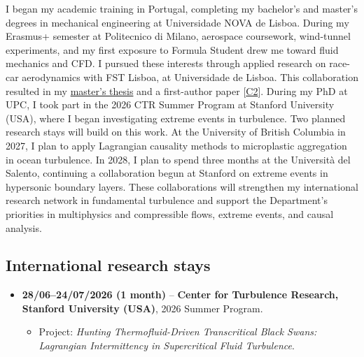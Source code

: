 \documentclass[11pt]{article}
\newcommand{\NEW}[1]{\iffinal #1\else{\color{red}#1}\fi} %
\begin{document}
I began my academic training in Portugal, completing my bachelor's and master's degrees in mechanical engineering at Universidade NOVA de Lisboa. During my Erasmus+ semester at Politecnico di Milano, aerospace coursework, \NEW{wind-tunnel} experiments, and my first exposure to Formula Student drew me toward fluid mechanics and CFD. I pursued these interests through applied research on race-car aerodynamics with FST Lisboa, at Universidade de Lisboa. This collaboration resulted in my \href{http://hdl.handle.net/10362/149236}{master's thesis}
and a first-author paper [\hyperlink{pub-C2}{C2}].
During my PhD at UPC, I took part in the 2026 CTR Summer Program at Stanford University (USA), where I began investigating extreme events in turbulence. Two planned research stays will build on this work. At the University of British Columbia in 2027, I plan to apply Lagrangian causality methods to microplastic aggregation in ocean turbulence. In 2028, I plan to spend three months at the Universit\`a del Salento, continuing a collaboration begun at Stanford on extreme events in hypersonic boundary layers. These collaborations will strengthen my international research network in fundamental turbulence and support the Department's priorities in multiphysics and compressible flows, extreme events, and causal analysis.

\subsection{International research stays}\label{sec:stays}
\begin{itemize}
  \item \textbf{28/06--24/07/2026 (1 month)} -- \textbf{Center for Turbulence
  Research, Stanford University (USA)}, 2026 Summer Program. 
  \begin{itemize}
    \item Project: \emph{Hunting Thermofluid-Driven Transcritical Black Swans:
    Lagrangian Intermittency in Supercritical Fluid Turbulence}.
  \end{itemize}
\end{itemize}
\end{document}
